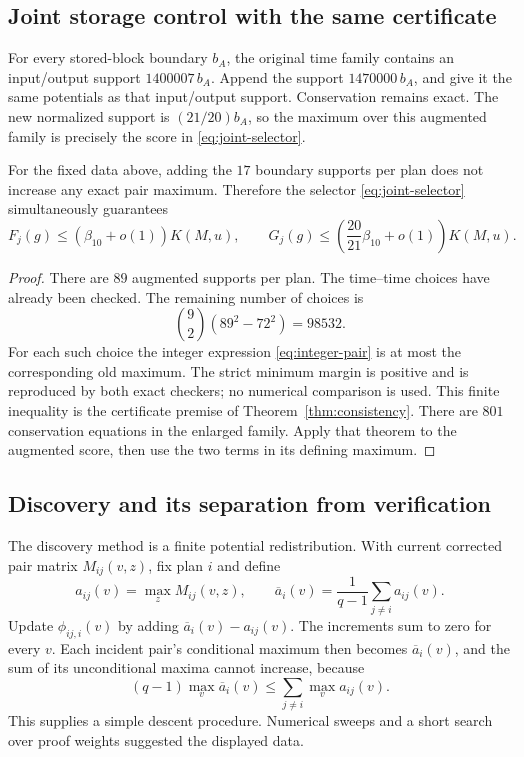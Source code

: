 \subsection{Joint storage control with the same certificate}

For every stored-block boundary $b_A$, the original time family contains
an input/output support $1400007\,b_A$. Append the support
$1470000\,b_A$, and give it the same potentials as that input/output
support. Conservation remains exact. The new normalized support is
$(21/20)b_A$, so the maximum over this augmented family is precisely
the score in \eqref{eq:joint-selector}.

\begin{lemma}\label{lem:joint}
For the fixed data above, adding the $17$ boundary supports per plan does
not increase any exact pair maximum. Therefore the selector
\eqref{eq:joint-selector} simultaneously guarantees
\[
 F_j(g)\le(\beta_{10}+o(1))K(M,u),\qquad
 G_j(g)\le\left(\frac{20}{21}\beta_{10}+o(1)\right)K(M,u).
\]
\end{lemma}
\begin{proof}
There are $89$ augmented supports per plan. The time--time choices have
already been checked. The remaining number of choices is
\[
 \binom92(89^2-72^2)=98532.
\]
For each such choice the integer expression
\eqref{eq:integer-pair} is at most the corresponding old maximum.
The strict minimum margin is positive and is reproduced by both exact
checkers; no numerical comparison is used. This finite inequality is the
certificate premise of Theorem~\ref{thm:consistency}. There are $801$
conservation equations in the enlarged family. Apply that theorem to the
augmented score, then use the two terms in its defining maximum.
\end{proof}

\subsection{Discovery and its separation from verification}

The discovery method is a finite potential redistribution. With current
corrected pair matrix $M_{ij}(v,z)$, fix plan $i$ and define
\[
 a_{ij}(v)=\max_z M_{ij}(v,z),\qquad
 \overline a_i(v)=\frac1{q-1}\sum_{j\ne i}a_{ij}(v).
\]
Update $\phi_{ij,i}(v)$ by adding
$\overline a_i(v)-a_{ij}(v)$. The increments sum to zero for every $v$.
Each incident pair's conditional maximum then becomes $\overline a_i(v)$,
and the sum of its unconditional maxima cannot increase, because
\[
 (q-1)\max_v\overline a_i(v)
 \le\sum_{j\ne i}\max_v a_{ij}(v).
\]
This supplies a simple descent procedure. Numerical sweeps and a short
search over proof weights suggested the displayed data.

